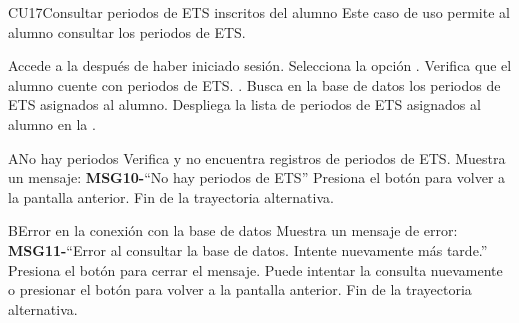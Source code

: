 

\begin{UseCase}{CU17}{Consultar periodos de ETS inscritos del alumno}{
		Este caso de uso permite al alumno consultar los periodos de ETS. 
	}
\end{UseCase}
\begin{UCtrayectoria}
	\UCpaso[\UCactor] Accede a la  después de haber iniciado sesión.
	\UCpaso[\UCactor] Selecciona la opción .
	\UCpaso Verifica que el alumno cuente con periodos de ETS. .
	\UCpaso Busca en la base de datos los periodos de ETS asignados al alumno.
	\UCpaso Despliega la lista de periodos de ETS asignados al alumno en la .
\end{UCtrayectoria}
\begin{UCtrayectoriaA}{A}{No hay periodos}
	\UCpaso Verifica y no encuentra registros de periodos de ETS.
	\UCpaso Muestra un mensaje: {\bf MSG10-}{``No hay periodos de ETS''}
	\UCpaso[\UCactor] Presiona el botón  para volver a la pantalla anterior.
	\UCpaso Fin de la trayectoria alternativa.
\end{UCtrayectoriaA}
\begin{UCtrayectoriaA}{B}{Error en la conexión con la base de datos}
	\UCpaso Muestra un mensaje de error: {\bf MSG11-}{``Error al consultar la base de datos. Intente nuevamente más tarde.''}
	\UCpaso[\UCactor] Presiona el botón  para cerrar el mensaje.
	\UCpaso[\UCactor] Puede intentar la consulta nuevamente o presionar el botón  para volver a la pantalla anterior.
	\UCpaso Fin de la trayectoria alternativa.
\end{UCtrayectoriaA}

